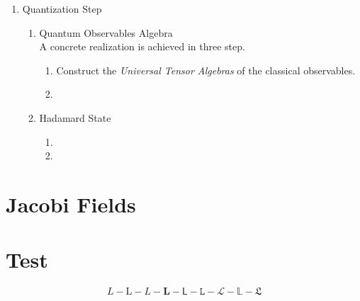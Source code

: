 \documentclass[Main]{subfiles}
\begin{document}
\begin{enumerate}
   		\item Quantization Step
   		   	\begin{enumerate}
   				\item Quantum Observables Algebra\\
   					A concrete realization is achieved in three step.
   					\begin{enumerate}
   						\item Construct the \emph{Universal Tensor Algebras} of the classical observables.
   						\item
   					\end{enumerate}
   					
   				\item Hadamard State
   				   	\begin{enumerate}
   						\item
   						\item
   					\end{enumerate}
   				 
   			\end{enumerate}
 	\end{enumerate}

\chapter{Jacobi Fields}




\chapter{Test}
	$$L - \mathrm{L} - \mathit{L}  - \mathbf{L} - \mathsf{L} - \mathtt{L}- \mathcal{L}- \mathbb{L}- \mathfrak{L}$$
\end{document}
